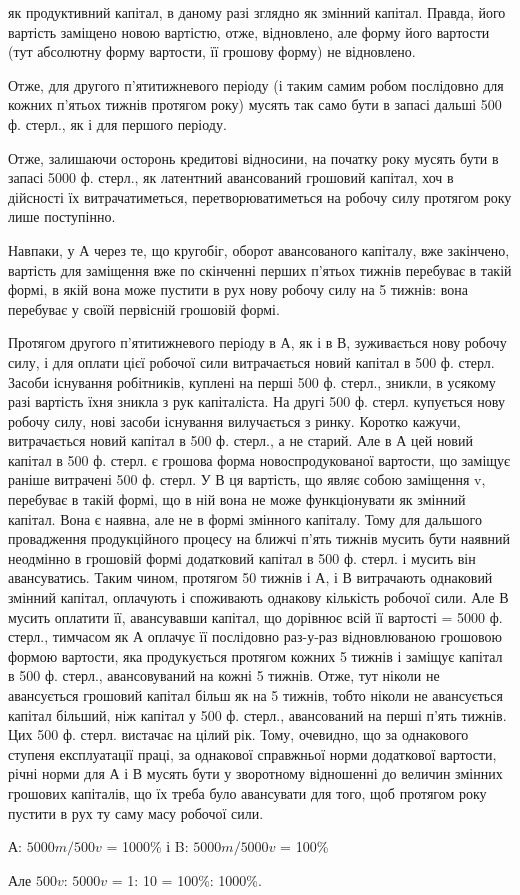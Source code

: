 \parcont{}  %
як продуктивний капітал, в даному разі зглядно як змінний капітал.
Правда, його вартість заміщено новою вартістю, отже, відновлено, але
форму його вартости (тут абсолютну форму вартости, її грошову форму)
не відновлено.

Отже, для другого п’ятитижневого періоду (і таким самим робом
послідовно для кожних п’ятьох тижнів протягом року) мусять так
само бути в запасі дальші 500 ф. стерл., як і для першого періоду.

Отже, залишаючи осторонь кредитові відносини, на початку року мусять
бути в запасі 5000 ф. стерл., як латентний авансований грошовий капітал,
хоч в дійсності їх витрачатиметься, перетворюватиметься на робочу
силу протягом року лише поступінно.

Навпаки, у А через те, що кругобіг, оборот авансованого капіталу,
вже закінчено, вартість для заміщення вже по скінченні перших п’ятьох
тижнів перебуває в такій формі, в якій вона може пустити в рух нову
робочу силу на 5 тижнів: вона перебуває у своїй первісній грошовій формі.

Протягом другого п’ятитижневого періоду в А, як і в В, зуживається
нову робочу силу, і для оплати цієї робочої сили витрачається новий капітал
в 500 ф. стерл. Засоби існування робітників, куплені на перші 500 ф.
стерл., зникли, в усякому разі вартість їхня зникла з рук капіталіста.
На другі 500 ф. стерл. купується нову робочу силу, нові засоби існування
вилучається з ринку. Коротко кажучи, витрачається новий капітал в 500 ф.
стерл., а не старий. Але в А цей новий капітал в 500 ф. стерл. є грошова
форма новоспродукованої вартости, що заміщує раніше витрачені 500 ф.
стерл. У В ця вартість, що являє собою заміщення v, перебуває в такій
формі, що в ній вона не може функціонувати як змінний капітал. Вона є
наявна, але не в формі змінного капіталу. Тому для дальшого провадження
продукційного процесу на ближчі п’ять тижнів мусить бути наявний неодмінно
в грошовій формі додатковий капітал в 500 ф. стерл. і мусить він авансуватись.
Таким чином, протягом 50 тижнів і А, і В витрачають однаковий
змінний капітал, оплачують і споживають однакову кількість робочої сили.
Але В мусить оплатити її, авансувавши капітал, що дорівнює всій її
вартості = 5000 ф. стерл., тимчасом як А оплачує її послідовно раз-у-раз
відновлюваною грошовою формою вартости, яка продукується протягом
кожних 5 тижнів і заміщує капітал в 500 ф. стерл., авансовуваний на кожні
5 тижнів. Отже, тут ніколи не авансується грошовий капітал більш як
на 5 тижнів, тобто ніколи не авансується капітал більший, ніж капітал
у 500 ф. стерл., авансований на перші п’ять тижнів. Цих 500 ф. стерл. вистачає
на цілий рік. Тому, очевидно, що за однакового ступеня експлуатації
праці, за однакової справжньої норми додаткової вартости, річні
норми для А і В мусять бути у зворотному відношенні до величин змінних
грошових капіталів, що їх треба було авансувати для того, щоб
протягом року пустити в рух ту саму масу робочої сили.

А: $5000 m / 500 v$ = 1000\% і B: $5000 m / 5000 v$ = 100\%

Але $500 v$: $5000 v$ = 1: 10 = 100\%: 1000\%.
